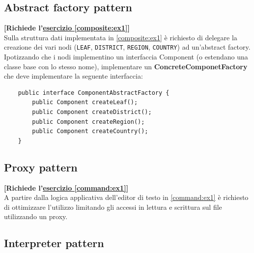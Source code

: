 \documentclass[12pt,a4paper]{article}
\begin{document}
    
    
    \subsection{Abstract factory pattern}\label{pattern:abstractFactory}
    \begin{Exercise}
    \small\textbf{[Richiede l'\hyperref[composite:ex1]{esercizio \ref{composite:ex1}}]}\\
    Sulla struttura dati implementata in \hyperref[composite:ex1]{\ref{composite:ex1}} è richiesto di delegare la creazione dei vari nodi (\texttt{LEAF}, \texttt{DISTRICT}, \texttt{REGION}, \texttt{COUNTRY}) ad un'abstract factory.
    Ipotizzando che i nodi implementino un interfaccia Component (o estendano una classe base con lo stesso nome), implementare un \textbf{ConcreteComponetFactory} che deve implementare la seguente interfaccia:
    \begin{lstlisting}
    public interface ComponentAbstractFactory {
        public Component createLeaf();
        public Component createDistrict();
        public Component createRegion();
        public Component createCountry();
    }
    \end{lstlisting}
    \end{Exercise}
    
    
    
    \subsection{Proxy pattern}\label{pattern:proxy}
    \begin{Exercise}
    \small\textbf{[Richiede l'\hyperref[command:ex1]{esercizio \ref{command:ex1}}]}\\
    A partire dalla logica applicativa dell'editor di testo in \hyperref[command:ex1]{\ref{command:ex1}} è richiesto di ottimizzare l'utilizzo limitando gli accessi in lettura e scrittura sul file utilizzando un proxy.
    \end{Exercise}
    

    
    \subsection{Interpreter pattern}\label{pattern:interpreter}
	\newcommand{\alt}[0]{{\;|\;}}    
    
\end{document}
